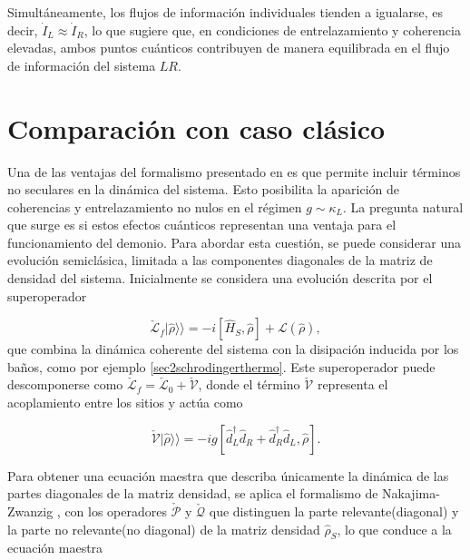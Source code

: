 Simultáneamente, los flujos de información individuales tienden a igualarse, es decir, \( \dot{I}_{L} \approx \dot{I}_{R} \), lo que sugiere que, en condiciones de entrelazamiento y coherencia elevadas, ambos puntos cuánticos contribuyen de manera equilibrada en el flujo de información del sistema $LR$. 


\label{sec5:demonio1}

\newpage 

\section{Comparación con caso clásico}
Una de las ventajas del formalismo presentado en \cite{potts2021thermodynamically} es que permite incluir términos no seculares en la dinámica del sistema. Esto posibilita la aparición de coherencias y entrelazamiento no nulos en el régimen \( g \sim \kappa_{L} \). La pregunta natural que surge es si estos efectos cuánticos representan una ventaja para el funcionamiento del demonio. Para abordar esta cuestión, se puede considerar una evolución semiclásica, limitada a las componentes diagonales de la matriz de densidad del sistema. Inicialmente se considera una evolución descrita por el superoperador

\begin{equation*}
\check{\mathcal{L}}_{f}|\hat{\rho}\rangle\rangle = -i[\hat{H}_{S}, \hat{\rho}] + \mathcal{L}(\hat{\rho}),
\end{equation*}
que combina la dinámica coherente del sistema con la disipación inducida por los baños, como por ejemplo \ref{sec2schrodingerthermo}. Este superoperador puede descomponerse como $\check{\mathcal{L}}_{f} = \check{\mathcal{L}}_{0} + \check{\mathcal{V}}$, donde el término $\check{\mathcal{V}}$ representa el acoplamiento entre los sitios y actúa como

\begin{equation*}
\check{\mathcal{V}}|\hat{\rho}\rangle\rangle = -ig[\hat{d}_{L}^{\dagger} \hat{d}_{R} + \hat{d}_{R}^{\dagger} \hat{d}_{L}, \hat{\rho}].
\end{equation*}

Para obtener una ecuación maestra que describa únicamente la dinámica de las partes diagonales de la matriz densidad, se aplica el formalismo de Nakajima-Zwanzig \cite{zwanzig1966statistical}, con los operadores $\check{\mathcal{P}}$ y $\check{\mathcal{Q}}$ que distinguen la parte relevante(diagonal) y la parte no relevante(no diagonal) de la matriz densidad $\hat{\rho}_{S}$, lo que conduce a la ecuación maestra

